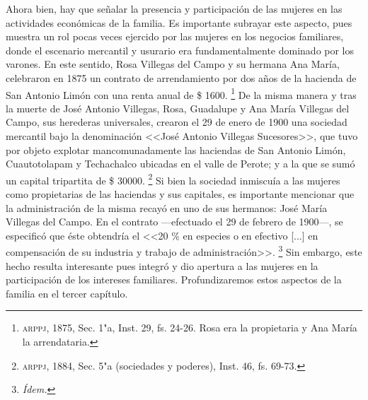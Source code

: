 \documentclass[14pt,twoside,final]{extbook} %
\let\oldfootnote\footnote
\renewcommand\footnote[1]{%
\oldfootnote{\hspace{1mm}#1}}
\begin{document}
Ahora bien, hay que señalar la presencia y participación de las mujeres en las actividades económicas de la familia. Es importante subrayar este aspecto, pues muestra un rol pocas veces ejercido por las mujeres en los negocios familiares, donde el escenario mercantil y usurario era fundamentalmente dominado por los varones. En este sentido, Rosa Villegas del Campo y su hermana Ana María, celebraron en 1875 un contrato de arrendamiento por dos años de la hacienda de San Antonio Limón con una renta anual de \$ 1600.\footnote{\textsc{arppj}, 1875, Sec. 1"a, Inst. 29, fs. 24-26. Rosa era la propietaria y Ana María la arrendataria.} De la misma manera y tras la muerte de José Antonio Villegas, Rosa, Guadalupe y Ana María Villegas del Campo, sus herederas universales, crearon el 29 de enero de 1900 una sociedad mercantil bajo la denominación <<José Antonio Villegas Sucesores>>, que tuvo por objeto explotar mancomunadamente las haciendas de San Antonio Limón, Cuautotolapam y Techachalco ubicadas en el valle de Perote; y a la que se sumó un capital tripartita de \$ 30000.\footnote{\textsc{arppj}, 1884, Sec. 5"a (sociedades y poderes), Inst. 46, fs. 69-73.} Si bien la sociedad inmiscuía a las mujeres como propietarias de las haciendas y sus capitales, es importante mencionar que la administración de la misma recayó en uno de sus hermanos: José María Villegas del Campo. En el contrato ---efectuado el 29 de febrero de 1900---, se especificó que éste obtendría el <<20 \% en especies o en efectivo [...] en compensación de su industria y trabajo de administración>>.\footnote{\em Ídem.} Sin embargo, este hecho resulta interesante pues integró y dio apertura a las mujeres en la participación de los intereses familiares. Profundizaremos estos aspectos de la familia en el tercer capítulo.
\end{document}
